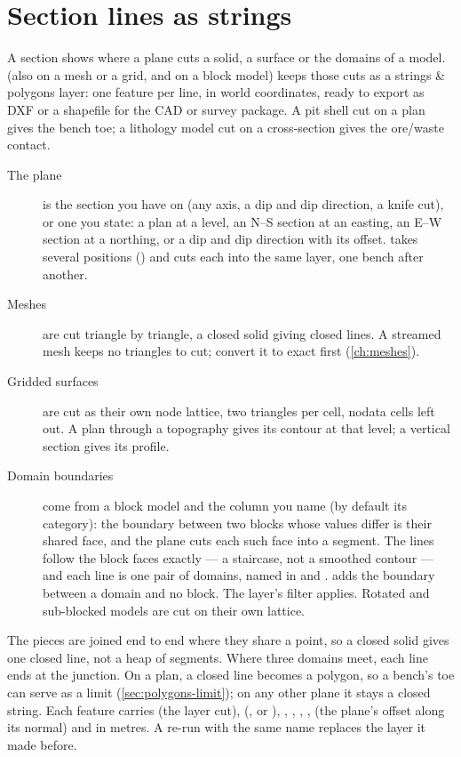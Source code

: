 \section{Section lines as strings}\label{sec:polygons-sectionlines}

A section shows where a plane cuts a solid, a surface or the domains of a model.  (also  on a mesh or a grid, and
 on a block model) keeps those cuts as a
strings \& polygons layer: one feature per line, in world coordinates, ready to export as DXF or a
shapefile for the CAD or survey package. A pit shell cut on a plan gives the bench toe; a lithology
model cut on a cross-section gives the ore/waste contact.

\begin{description}
\item[The plane] is the section you have on (any axis, a dip and dip direction, a knife cut), or one
  you state: a plan at a level, an N--S section at an easting, an E--W section at a northing, or a dip
  and dip direction with its offset.  takes several positions () and
  cuts each into the same layer, one bench after another.
\item[Meshes] are cut triangle by triangle, a closed solid giving closed lines. A streamed mesh keeps
  no triangles to cut; convert it to exact first (\cref{ch:meshes}).
\item[Gridded surfaces] are cut as their own node lattice, two triangles per cell, nodata cells left
  out. A plan through a topography gives its contour at that level; a vertical section gives its
  profile.
\item[Domain boundaries] come from a block model and the column you name (by default its category):
  the boundary between two blocks whose values differ is their shared face, and the plane cuts each
  such face into a segment. The lines follow the block faces exactly --- a staircase, not a
  smoothed contour --- and each line is one pair of domains, named in  and .
   adds the boundary between a domain and no block. The layer's filter applies.
  Rotated and sub-blocked models are cut on their own lattice.
\end{description}

The pieces are joined end to end where they share a point, so a closed solid gives one closed line,
not a heap of segments. Where three domains meet, each line ends at the junction. On a plan, a closed
line becomes a polygon, so a bench's toe can serve as a limit (\cref{sec:polygons-limit}); on any other
plane it stays a closed string. Each feature carries  (the layer cut), 
(,  or ), , , , ,
 (the plane's offset along its normal) and  in metres. A re-run with the
same name replaces the layer it made before.

